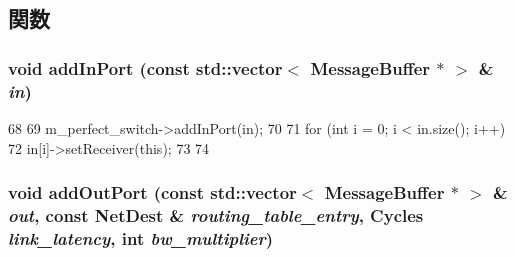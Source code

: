 \subsection{関数}
\hypertarget{classSwitch_a1c4c43d5cc554f870b4c7a485fb25c7e}{
\subsubsection[{addInPort}]{\setlength{\rightskip}{0pt plus 5cm}void addInPort (const {\bf std::vector}$<$ {\bf MessageBuffer} $\ast$ $>$ \& {\em in})}}
\label{classSwitch_a1c4c43d5cc554f870b4c7a485fb25c7e}



\begin{DoxyCode}
68 {
69     m_perfect_switch->addInPort(in);
70 
71     for (int i = 0; i < in.size(); i++) {
72         in[i]->setReceiver(this);
73     }
74 }
\end{DoxyCode}
\hypertarget{classSwitch_ac0f1adb20e837d8c920d4b5aea6785a2}{
\subsubsection[{addOutPort}]{\setlength{\rightskip}{0pt plus 5cm}void addOutPort (const {\bf std::vector}$<$ {\bf MessageBuffer} $\ast$ $>$ \& {\em out}, \/  const {\bf NetDest} \& {\em routing\_\-table\_\-entry}, \/  {\bf Cycles} {\em link\_\-latency}, \/  int {\em bw\_\-multiplier})}}
\label{classSwitch_ac0f1adb20e837d8c920d4b5aea6785a2}



